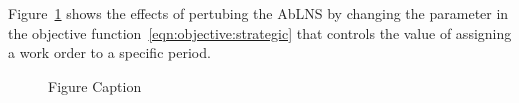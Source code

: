 Figure~\ref{fig:responses:value_change} shows the effects of pertubing the AbLNS by changing the 
parameter in the objective function~\ref{eqn:objective:strategic} that controls the value of assigning a work
order to a specific period.  

\begin{figure}[H]%
	\centering
	\resizebox{\linewidth}{!}{
		
	}
	\caption{Figure Caption}
	\label{fig:responses:value_change}
\end{figure}
 
